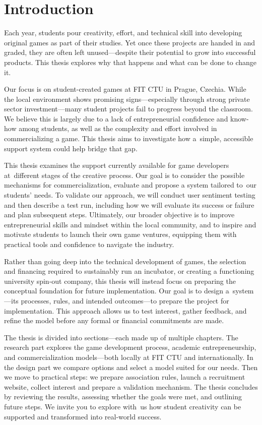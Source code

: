 \chapter*{Introduction}
Each year, students pour creativity, effort, and technical skill into developing original games as part of their studies. Yet once these projects are handed in and graded, they are often left unused---despite their potential to grow into successful products. This thesis explores why that happens and what can be done to change it.

Our focus is on student-created games at FIT CTU in Prague, Czechia. While the local environment shows promising signs---especially through strong private sector investment---many student projects fail to progress beyond the classroom. We believe this is largely due to a lack of entrepreneurial confidence and know-how among students, as well as the complexity and effort involved in commercializing a game. This thesis aims to investigate how a~simple, accessible support system could help bridge that gap.

This thesis examines the support currently available for game developers at~different stages of the creative process. Our goal is to consider the possible mechanisms for commercialization, evaluate and propose a system tailored to~our students’ needs. To validate our approach, we will conduct user sentiment testing and then describe a test run, including how we will evaluate its success or failure and plan subsequent steps. Ultimately, our broader objective is to improve entrepreneurial skills and mindset within the local community, and to inspire and motivate students to launch their own game ventures, equipping them with practical tools and confidence to navigate the industry.

Rather than going deep into the technical development of games, the selection and financing required to sustainably run an incubator, or creating a functioning university spin-out company, this thesis will instead focus on preparing the conceptual foundation for future implementation. Our goal is to design a~system---its processes, rules, and intended outcomes---to prepare the project for implementation. This approach allows us to test interest, gather feedback, and refine the model before any formal or financial commitments are made.

The thesis is divided into sections---each made up of multiple chapters. The research part explores the game development process, academic entrepreneurship, and commercialization models---both locally at FIT CTU and internationally. In the design part we compare options and select a model suited for our needs. Then we move to practical steps: we prepare association rules, launch a recruitment website, collect interest and prepare a validation mechanism. The thesis concludes by reviewing the results, assessing whether the goals were met, and outlining future steps. We invite you to explore with~us how student creativity can be supported and transformed into real-world success.